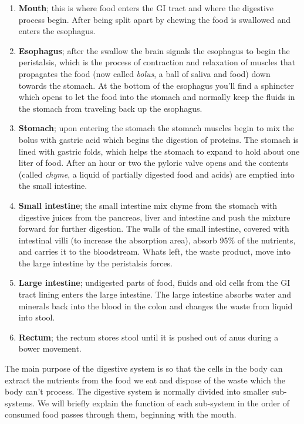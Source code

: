 \documentclass[thesis.tex]{subfiles}
\begin{document}
\begin{enumerate}
\item \textbf{Mouth}; this is where food enters the GI tract and where the digestive process begin. After being split apart by chewing the food is swallowed and enters the esophagus.
\item \textbf{Esophagus}; after the swallow the brain signals the esophagus to begin the peristalsis, which is the process of contraction and relaxation of muscles that propagates the food (now called \textit{bolus}, a ball of saliva and food) down towards the stomach. At the bottom of the esophagus you'll find a sphincter which opens to let the food into the stomach and normally keep the fluids in the stomach from traveling back up the esophagus.
\item \textbf{Stomach}; upon entering the stomach the stomach muscles begin to mix the bolus with gastric acid which begins the digestion of proteins. The stomach is lined with gastric folds, which helps the stomach to expand to hold about one liter of food. After an hour or two the pyloric valve opens and the contents (called \textit{chyme}, a liquid of partially digested food and acids) are emptied into the small intestine.
\item \textbf{Small intestine}; the small intestine mix chyme from the stomach with digestive juices from the pancreas, liver and intestine and push the mixture forward for further digestion. The walls of the small intestine, covered with intestinal villi (to increase the absorption area), absorb 95\% of the nutrients, and carries it to the bloodstream. Whats left, the waste product, move into the large intestine by the peristalsis forces.
\item \textbf{Large intestine}; undigested parts of food, fluids and old cells from the GI tract lining enters the large intestine. The large intestine absorbs water and minerals back into the blood in the colon and changes the waste from liquid into stool.
\item \textbf{Rectum}; the rectum stores stool until it is pushed out of anus during a bower movement.
\end{enumerate}

The main purpose of the digestive system is so that the cells in the body can extract the nutrients from the food we eat and dispose of the waste which the body can't process. The digestive system is normally divided into smaller sub-systems. We will briefly explain the function of each sub-system in the order of consumed food passes through them, beginning with the mouth. 
\end{document}
